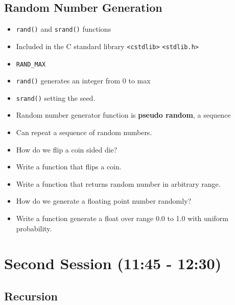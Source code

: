 \documentclass[11pt]{article}
\begin{document}
\subsection{Random Number Generation}
\label{sec-1-3}

\begin{itemize}
\item \verb~rand()~ and \verb~srand()~ functions
\item Included in the C standard library \verb~<cstdlib>~ \verb~<stdlib.h>~
\item \verb~RAND_MAX~
\item \verb~rand()~ generates an integer from 0 to max
\item \verb~srand()~ setting the seed.
\item Random number generator function is \textbf{pseudo random}, a sequence
\item Can repeat a sequence of random numbers.
\item How do we flip a coin sided die?
\item Write a function that flips a coin.
\item Write a function that returns random number in arbitrary range.
\item How do we generate a floating point number randomly?
\item Write a function generate a float over range 0.0 to 1.0 with uniform probability.
\end{itemize}
\section{Second Session (11:45 - 12:30)}
\label{sec-2}
\subsection{Recursion}
\label{sec-2-1}
\end{document}

